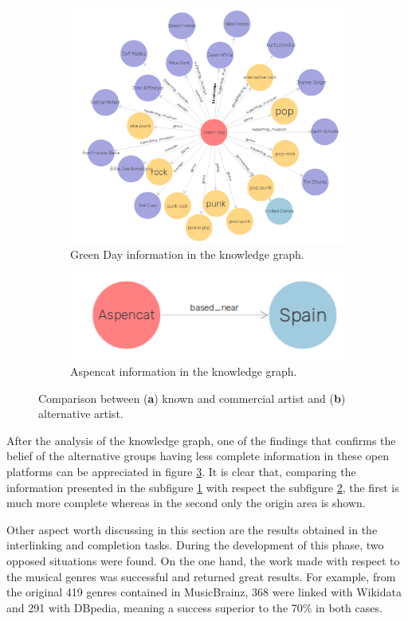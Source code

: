 \begin{figure}[!tbh]
	\centering
	\begin{subfigure}{\columnwidth}
		\centering
		\includegraphics[width=0.8\linewidth]{images/greenday.png}
		\caption{Green Day information in the knowledge graph.}
		\label{subfig:green_day}
	\end{subfigure}
	\begin{subfigure}{\columnwidth}
		\centering
		\includegraphics[width=0.5\linewidth]{images/aspencat.png}
		\caption{Aspencat information in the knowledge graph.}
		\label{subfig:aspencat}
	\end{subfigure}

	\caption{Comparison between (\textbf{a}) known and commercial artist and (\textbf{b}) alternative artist.}
	\label{fig:graph-comp}
\end{figure}

After the analysis of the knowledge graph, one of the findings that confirms the belief of the alternative groups having less complete information in these open platforms can be appreciated in figure \ref{fig:graph-comp}.
It is clear that, comparing the information presented in the subfigure \ref{subfig:green_day} with respect the subfigure \ref{subfig:aspencat}, the first is much more complete whereas in the second only the origin area is shown. 

Other aspect worth discussing in this section are the results obtained in the interlinking and completion tasks.
During the development of this phase, two opposed situations were found.
On the one hand, the work made with respect to the musical genres was successful and returned great results.
For example, from the original 419 genres contained in MusicBrainz, 368 were linked with Wikidata and 291 with DBpedia, meaning a success superior to the 70\% in both cases.

